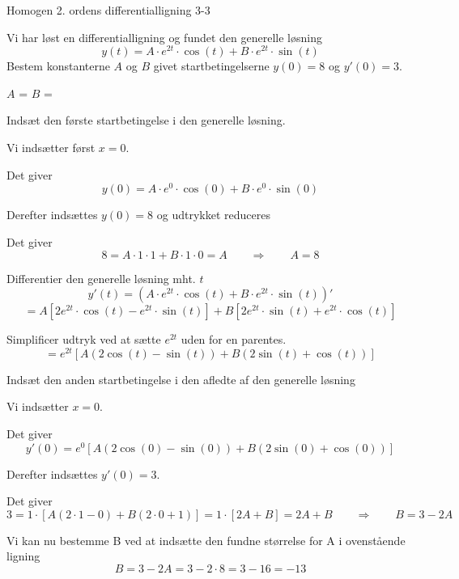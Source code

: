 \documentclass{article}
\begin{document}
\newpage

\begin{exercise}{Homogen 2. ordens differentialligning 3-3}

Vi har løst en differentialligning og fundet den generelle løsning
\[
y(t) = A \cdot e^{2 t} \cdot \cos(t)+ B \cdot e^{2 t} \cdot \sin(t)
\]
Bestem konstanterne $A$ og $B$ givet startbetingelserne $y(0)=8$ og $y'(0)=3$.


$A$ = 
$B$ = 

\hint

Indsæt den første startbetingelse i den generelle løsning.


\hint

Vi indsætter først $x=0$.

\hint

Det giver
\[
y(0)= A \cdot e^{0} \cdot \cos(0)+ B \cdot e^{0} \cdot \sin(0)
\]

\hint

Derefter indsættes $y(0)=8$ og udtrykket reduceres

\hint

Det giver
\[
8= A \cdot 1 \cdot 1+ B \cdot 1 \cdot 0 = A \qquad \Rightarrow \qquad A = 8
\]

\hint

Differentier den generelle løsning mht. $t$
\[
y'(t) = \left(A \cdot e^{2 t} \cdot \cos(t)+ B \cdot e^{2 t} \cdot \sin(t)\right)'
\]
\[
= A \left[2 e^{2t} \cdot \cos(t) - e^{2t} \cdot \sin(t) \right] + B \left[ 2 e^{2t} \cdot \sin(t) + e^{2t} \cdot \cos(t) \right]
\]

\hint

Simplificer udtryk ved at sætte $e^{2t}$ uden for en parentes.
\[
= e^{2t} \left[ A (2 \cos(t) - \sin(t)) + B (2 \sin(t) + \cos(t)) \right]
\]

\hint

Indsæt den anden startbetingelse i den afledte af den generelle løsning

\hint

Vi indsætter $x=0$.

\hint

Det giver
\[
y'(0) = e^{0} \left[ A (2 \cos(0)- \sin(0)) + B (2 \sin(0) + \cos(0)) \right]
\]

\hint

Derefter indsættes $y'(0)=3$.
\hint

Det giver
\[
3 = 1 \cdot \left[ A (2 \cdot 1 - 0) + B (2 \cdot 0 + 1) \right] = 1 \cdot \left[ 2A + B \right] = 2 A + B \qquad \Rightarrow \qquad B = 3 - 2 A
\]

\hint

Vi kan nu bestemme B ved at indsætte den fundne størrelse for A i ovenstående ligning
\[
B = 3 - 2 A = 3 - 2 \cdot 8 = 3 - 16 = -13
\]


\end{exercise}
\end{document}

